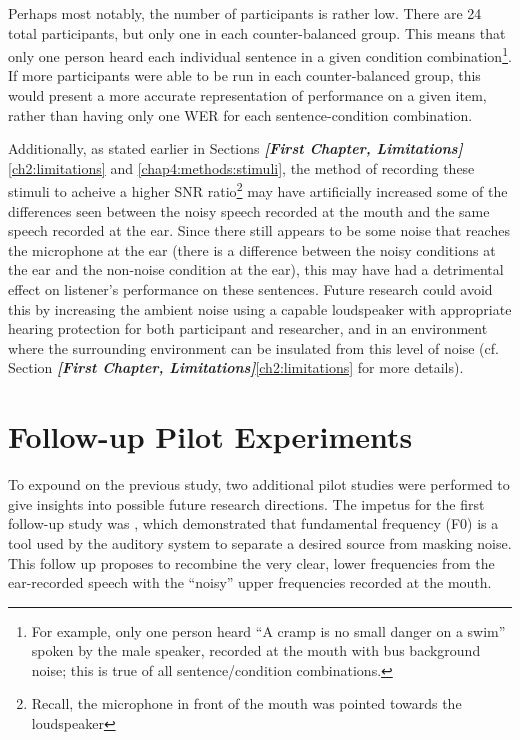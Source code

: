 \documentclass[dissertation,copyright]{uathesis}
\begin{document}
Perhaps most notably, the number of participants is rather low.  There are 24 total participants, but only one in each counter-balanced group.  This means that only one person heard each individual sentence in a given condition combination\footnote{For example, only one person heard ``A cramp is no small danger on a swim'' spoken by the male speaker, recorded at the mouth with bus background noise; this is true of all sentence/condition combinations.}.  If more participants were able to be run in each counter-balanced group, this would present a more accurate representation of performance on a given item, rather than having only one WER for each sentence-condition combination.

Additionally, as stated earlier in Sections \textit{\textbf{[First Chapter, Limitations]}}\ref{ch2:limitations} and \ref{chap4:methods:stimuli}, the method of recording these stimuli to acheive a higher SNR ratio\footnote{Recall, the microphone in front of the mouth was pointed towards the loudspeaker} may have artificially increased some of the differences seen between the noisy speech recorded at the mouth and the same speech recorded at the ear.  Since there still appears to be some noise that reaches the microphone at the ear (there is a difference between the noisy conditions at the ear and the non-noise condition at the ear), this may have had a detrimental effect on listener's performance on these sentences.  Future research could avoid this by increasing the ambient noise using a capable loudspeaker with appropriate hearing protection for both participant and researcher, and in an environment where the surrounding environment can be insulated from this level of noise (cf. Section \textit{\textbf{[First Chapter, Limitations]}}\ref{ch2:limitations} for more details).


\section{Follow-up Pilot Experiments}
\label{ch4:follow-up-expts}

To expound on the previous study, two additional pilot studies were performed to give insights into possible future research directions.  The impetus for the first follow-up study was \cite{bird:97}, which demonstrated that fundamental frequency (F0) is a tool used by the auditory system to separate a desired source from masking noise.  This follow up proposes to recombine the very clear, lower frequencies from the ear-recorded speech with the ``noisy'' upper frequencies recorded at the mouth.  
\end{document}
